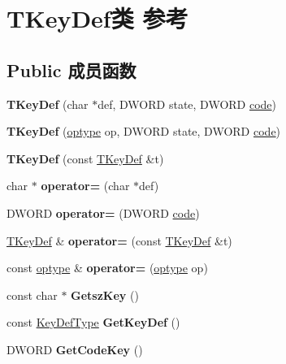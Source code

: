 \hypertarget{class_t_key_def}{}\section{T\+Key\+Def类 参考}
\label{class_t_key_def}
\subsection*{Public 成员函数}
\begin{DoxyCompactItemize}
\item 
\mbox{\label{class_t_key_def_a18c46e0473b56aa869628431642b2461}} 
{\bfseries T\+Key\+Def} (char $\ast$def, D\+W\+O\+RD state, D\+W\+O\+RD \hyperlink{structcode}{code})
\item 
\mbox{\label{class_t_key_def_ac0ff53e7d1249e878ca345cc2f781caa}} 
{\bfseries T\+Key\+Def} (\hyperlink{structoptype}{optype} op, D\+W\+O\+RD state, D\+W\+O\+RD \hyperlink{structcode}{code})
\item 
\mbox{\label{class_t_key_def_ac9d99c0cf3c6a0133c37961860f06e33}} 
{\bfseries T\+Key\+Def} (const \hyperlink{class_t_key_def}{T\+Key\+Def} \&t)
\item 
\mbox{\label{class_t_key_def_a6a45468675de01691b16d32ba5b88803}} 
char $\ast$ {\bfseries operator=} (char $\ast$def)
\item 
\mbox{\label{class_t_key_def_a14d90fbc90286a59c2d07ce134ba30b3}} 
D\+W\+O\+RD {\bfseries operator=} (D\+W\+O\+RD \hyperlink{structcode}{code})
\item 
\mbox{\label{class_t_key_def_a70045503c25589154c4d7876df730877}} 
\hyperlink{class_t_key_def}{T\+Key\+Def} \& {\bfseries operator=} (const \hyperlink{class_t_key_def}{T\+Key\+Def} \&t)
\item 
\mbox{\label{class_t_key_def_a45cb308b9902f6d1ca23fdb665dca3cf}} 
const \hyperlink{structoptype}{optype} \& {\bfseries operator=} (\hyperlink{structoptype}{optype} op)
\item 
\mbox{\label{class_t_key_def_ac3fa9cafc0fd6d22b11302bef52eedac}} 
const char $\ast$ {\bfseries Getsz\+Key} ()
\item 
\mbox{\label{class_t_key_def_a70cded26f361951856720915983ee888}} 
const \hyperlink{union_key_def_type}{Key\+Def\+Type} {\bfseries Get\+Key\+Def} ()
\item 
\mbox{\label{class_t_key_def_a2dcb92b99ae8fd008f5047c27bfaf176}} 
D\+W\+O\+RD {\bfseries Get\+Code\+Key} ()
\end{DoxyCompactItemize}
